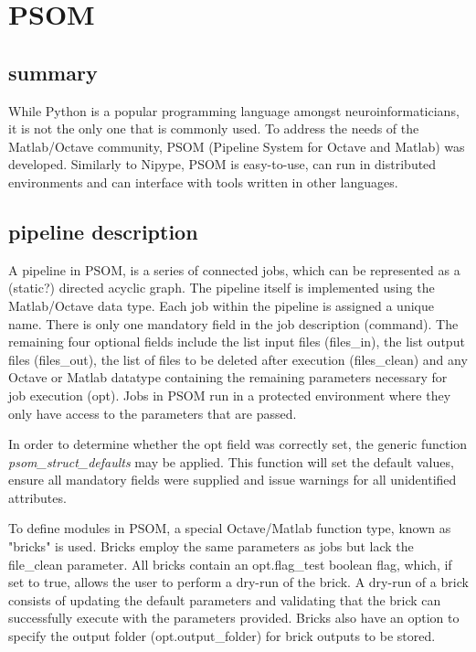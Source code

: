 \documentclass{report}
\begin{document}
    \section{PSOM} \subsection{summary} While Python is a popular programming
    language amongst neuroinformaticians, it is not the only one that is
    commonly used. To address the needs of the Matlab/Octave community, PSOM
    (Pipeline System for Octave and Matlab) was developed. Similarly to Nipype,
    PSOM is easy-to-use, can run in distributed environments and can interface
    with tools written in other languages.

        \subsection{pipeline description} A pipeline in PSOM, is a series of
        connected jobs, which can be represented as a (static?) directed acyclic
        graph. The pipeline itself is implemented using the Matlab/Octave data
        type. Each job within the pipeline is assigned a unique name. There is
        only one mandatory field in the job description (command). The remaining
        four optional fields include the list input files (files\_in), the list
        output files (files\_out), the list of files to be deleted after
        execution (files\_clean) and any Octave or Matlab datatype containing
        the remaining parameters necessary for job execution (opt).  Jobs in
        PSOM run in a protected environment where they only have access to the
        parameters that are passed. 

        In order to determine whether the opt field was correctly set, the
        generic function \textit{psom\_struct\_defaults} may be applied. This
        function will set the default values, ensure all mandatory fields were
        supplied and issue warnings for all unidentified attributes.

        To define modules in PSOM, a special Octave/Matlab function type, known
        as "bricks" is used. Bricks employ the same parameters as jobs but lack
        the file\_clean parameter. All bricks contain an opt.flag\_test boolean
        flag, which, if set to true, allows the user to perform a dry-run of the
        brick. A dry-run of a brick consists of updating the default parameters
        and validating that the brick can successfully execute with the
        parameters provided. Bricks also have an option to specify the output
        folder (opt.output\_folder) for brick outputs to be stored.
\end{document}
